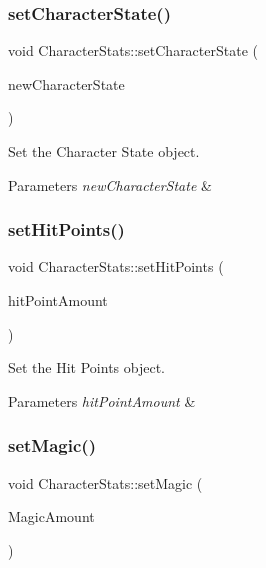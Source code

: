 \subsubsection{\texorpdfstring{setCharacterState()}{setCharacterState()}}
{\footnotesize\ttfamily void Character\+Stats\+::set\+Character\+State (\begin{DoxyParamCaption}\item[{State\+Of\+Character}]{new\+Character\+State }\end{DoxyParamCaption})\hspace{0.3cm}{\ttfamily [inline]}}



Set the Character State object. 


\begin{DoxyParams}{Parameters}
{\em new\+Character\+State} & \\
\hline
\end{DoxyParams}
\mbox{\label{classCharacterStats_a7359c58479aebab283da03a0503cedf0}} 
\subsubsection{\texorpdfstring{setHitPoints()}{setHitPoints()}}
{\footnotesize\ttfamily void Character\+Stats\+::set\+Hit\+Points (\begin{DoxyParamCaption}\item[{int}]{hit\+Point\+Amount }\end{DoxyParamCaption})\hspace{0.3cm}{\ttfamily [inline]}}



Set the Hit Points object. 


\begin{DoxyParams}{Parameters}
{\em hit\+Point\+Amount} & \\
\hline
\end{DoxyParams}
\mbox{\label{classCharacterStats_a196481abbfd88753d5e6a55662ea086f}} 
\subsubsection{\texorpdfstring{setMagic()}{setMagic()}}
{\footnotesize\ttfamily void Character\+Stats\+::set\+Magic (\begin{DoxyParamCaption}\item[{int}]{Magic\+Amount }\end{DoxyParamCaption})\hspace{0.3cm}{\ttfamily [inline]}}



